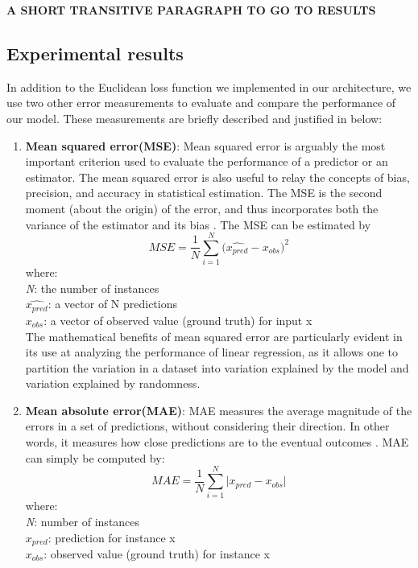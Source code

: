  

\textbf{A SHORT TRANSITIVE PARAGRAPH TO GO TO RESULTS}

\subsection{Experimental results}

In addition to the Euclidean loss function we implemented in our architecture, we use two other error measurements to evaluate and compare the performance of our model. These measurements are briefly described and justified in below:
\begin{enumerate}
\item \textbf{Mean squared error(MSE)}: Mean squared error is arguably the most important criterion used to evaluate the performance of a predictor or an estimator. The mean squared error is also useful to relay the concepts of bias, precision, and accuracy in statistical estimation. The MSE is the second moment (about the origin) of the error, and thus incorporates both the variance of the estimator and its bias \cite{lehmann1998theory}. The MSE can be estimated by
$$MSE = {\frac{1} {N}{\sum\limits_{i = 1}^N {(\hat{x_{pred}} - x_{obs} } })^{2} } $$
where:\\
\textit{N}: the number of instances\\
\textit{ $\hat{x_{pred}}$}: a vector of N predictions\\
\textit{$x_{obs}$}: a vector of observed value (ground truth) for input x\\

The mathematical benefits of mean squared error are particularly evident in its use at analyzing the performance of linear regression, as it allows one to partition the variation in a dataset into variation explained by the model and variation explained by randomness.
\item \textbf{Mean absolute error(MAE)}: MAE measures the average magnitude of the errors in a set of predictions, without considering their direction. In other words, it measures how close predictions are to the eventual outcomes \cite{willmott2005advantages}. MAE can simply be computed by:
$$MAE = {\frac{1} {N}{\sum\limits_{i = 1}^N {|x_{pred} - x_{obs} } }| } $$
where:\\
\textit{N}: number of instances\\
\textit{ $x_{pred}$}: prediction for instance x\\
\textit{$x_{obs}$}: observed value (ground truth) for instance x
\end{enumerate}

